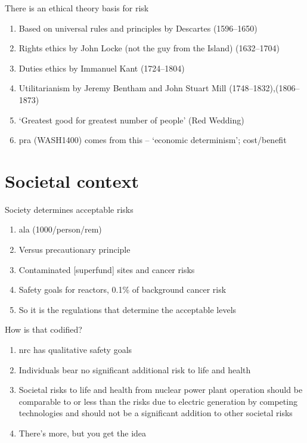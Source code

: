 \documentclass[aspectratio=1610,pdftex,dvipsnames,compress,xcolor={dvipsnames}]{beamer}
\newcommand{\acf}{\acrfull} %
\newcommand{\acs}{\acrshort} %
\begin{document}
\addtocounter{framenumber}{-1}
\begin{frame}{There is an ethical theory basis for risk}
    \begin{enumerate}[series=outerlist,topsep=0pt,itemsep=21pt,leftmargin=*,label=(\arabic*)]
        \item[]Based on universal rules and principles by Descartes (1596--1650)
        \item[]Rights ethics by John Locke (not the guy from the Island) (1632--1704)
        \item[]Duties ethics by Immanuel Kant (1724--1804)
        \item[]Utilitarianism by Jeremy Bentham and John Stuart Mill (1748--1832),(1806--1873)
        \item[]`Greatest good for greatest number of people' (Red Wedding)
        \item[]\acs{pra} (WASH1400) comes from this -- `economic determinism'; cost/benefit
    \end{enumerate}
\end{frame}


\section{Societal context}


\addtocounter{framenumber}{-1}
\begin{frame}{Society determines acceptable risks}
    \begin{enumerate}[series=outerlist,topsep=0pt,itemsep=21pt,leftmargin=*,label=(\arabic*)]
        \item[]\acf{ala} (1000/person/rem)
        \item[]Versus precautionary principle
        \item[]Contaminated [superfund] sites and cancer risks
        \item[]Safety goals for reactors, 0.1\% of background cancer risk
        \item[]So it is the regulations that determine the acceptable levels
    \end{enumerate}
\end{frame}


\begin{frame}{How is that codified?}
    \begin{enumerate}[series=outerlist,topsep=0pt,itemsep=21pt,leftmargin=*,label=(\arabic*)]
        \item[]\acs{nrc} has qualitative safety goals
        \item[]Individuals bear no significant additional risk to life and health
        \item[]Societal risks to life and health from nuclear power plant operation should be comparable to or less than the risks due to electric generation by competing technologies and should not be a significant addition to other societal risks
        \item[]There’s more, but you get the idea
    \end{enumerate}
\end{frame}
\end{document}
